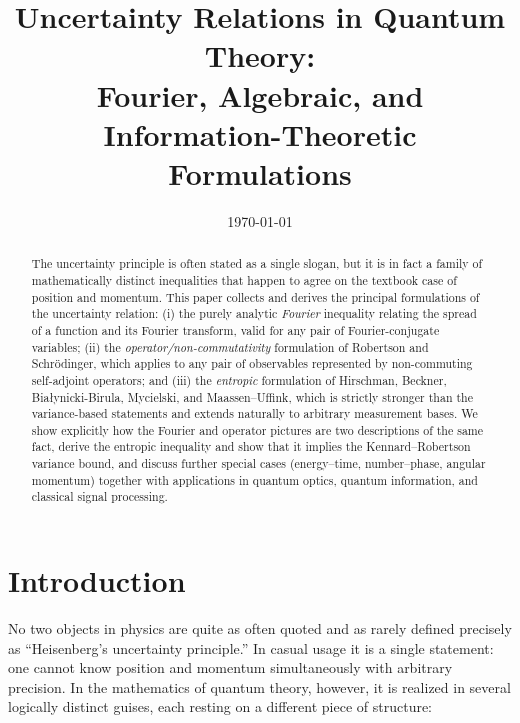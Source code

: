 \documentclass[11pt]{article}
\title{\textbf{Uncertainty Relations in Quantum Theory:\\
Fourier, Algebraic, and Information-Theoretic Formulations}}
\author{}
\date{\today}
\theoremstyle{plain}
\theoremstyle{definition}
\theoremstyle{remark}
\begin{document}
\maketitle

\begin{abstract}
\noindent
The uncertainty principle is often stated as a single slogan, but it is in fact a family of
mathematically distinct inequalities that happen to agree on the textbook case of position and
momentum. This paper collects and derives the principal formulations of the uncertainty
relation: (i) the purely analytic \emph{Fourier} inequality relating the spread of a function and
its Fourier transform, valid for any pair of Fourier-conjugate variables; (ii) the
\emph{operator/non-commutativity} formulation of Robertson and Schr\"odinger, which applies to any
pair of observables represented by non-commuting self-adjoint operators; and (iii) the
\emph{entropic} formulation of Hirschman, Beckner, Bia\l ynicki-Birula, Mycielski, and
Maassen--Uffink, which is strictly stronger than the variance-based statements and extends
naturally to arbitrary measurement bases. We show explicitly how the Fourier and operator
pictures are two descriptions of the same fact, derive the entropic inequality and show that it
implies the Kennard--Robertson variance bound, and discuss further special cases (energy--time,
number--phase, angular momentum) together with applications in quantum optics, quantum
information, and classical signal processing.
\end{abstract}

\tableofcontents

\section{Introduction}

No two objects in physics are quite as often quoted and as rarely defined precisely as
``Heisenberg's uncertainty principle.'' In casual usage it is a single statement: one cannot know
position and momentum simultaneously with arbitrary precision. In the mathematics of quantum
theory, however, it is realized in several logically distinct guises, each resting on a different
piece of structure:
\end{document}
